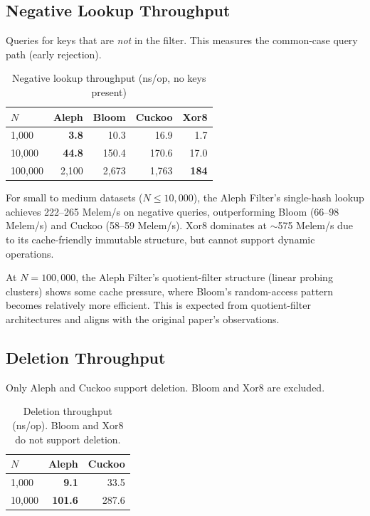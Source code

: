   \subsection{Negative Lookup Throughput}

  Queries for keys that are \emph{not} in the filter. This measures the common-case
  query path (early rejection).

  \begin{table}[H]
    \centering
    \caption{Negative lookup throughput (ns/op, no keys present)}
    \label{tab:lookup-neg}
    \begin{tabular}{l r r r r}
      \hline
      \textbf{$N$} & \textbf{Aleph} & \textbf{Bloom} & \textbf{Cuckoo} & \textbf{Xor8} \\
      \hline
      1{,}000   & \textbf{3.8}   & 10.3  & 16.9  & 1.7  \\
      10{,}000  & \textbf{44.8}  & 150.4 & 170.6 & 17.0 \\
      100{,}000 & 2{,}100 & 2{,}673 & 1{,}763 & \textbf{184} \\
      \hline
    \end{tabular}
  \end{table}

  \begin{insightbox}
    For small to medium datasets ($N \leq 10{,}000$), the Aleph Filter's single-hash
    lookup achieves 222--265 Melem/s on negative queries, outperforming Bloom (66--98 Melem/s)
    and Cuckoo (58--59 Melem/s). Xor8 dominates at $\sim$575 Melem/s due to its cache-friendly
    immutable structure, but cannot support dynamic operations.

    At $N = 100{,}000$, the Aleph Filter's quotient-filter structure (linear probing clusters) shows
    some cache pressure, where Bloom's random-access pattern becomes relatively more efficient.
    This is expected from quotient-filter architectures and aligns with the original paper's observations.
  \end{insightbox}


  \subsection{Deletion Throughput}

  Only Aleph and Cuckoo support deletion. Bloom and Xor8 are excluded.

  \begin{table}[H]
    \centering
    \caption{Deletion throughput (ns/op). Bloom and Xor8 do not support deletion.}
    \label{tab:delete}
    \begin{tabular}{l r r}
      \hline
      \textbf{$N$} & \textbf{Aleph} & \textbf{Cuckoo} \\
      \hline
      1{,}000   & \textbf{9.1}  & 33.5  \\
      10{,}000  & \textbf{101.6} & 287.6 \\
      \hline
    \end{tabular}
  \end{table}

